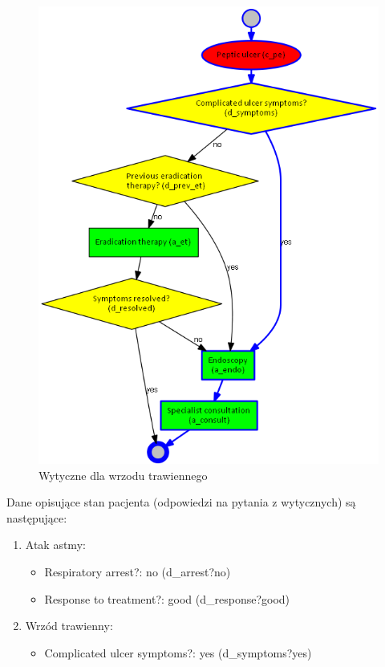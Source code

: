 \begin{figure}[H]
\centering
\includegraphics[scale=0.45]{img/peptic-ulcer.png}
\caption{Wytyczne dla wrzodu trawiennego}
\label{fig:pu}
\end{figure}

Dane opisujące stan pacjenta (odpowiedzi na pytania z wytycznych) są następujące:
\begin{enumerate}
\item{Atak astmy:
	\begin{itemize}
	\item{Respiratory arrest?: no (d\_arrest?no)}
	\item{Response to treatment?: good (d\_response?good)}
	\end{itemize}
}
\item{Wrzód trawienny:
	\begin{itemize}
	\item{Complicated ulcer symptoms?: yes (d\_symptoms?yes)}
	\end{itemize}
}
\end{enumerate}

